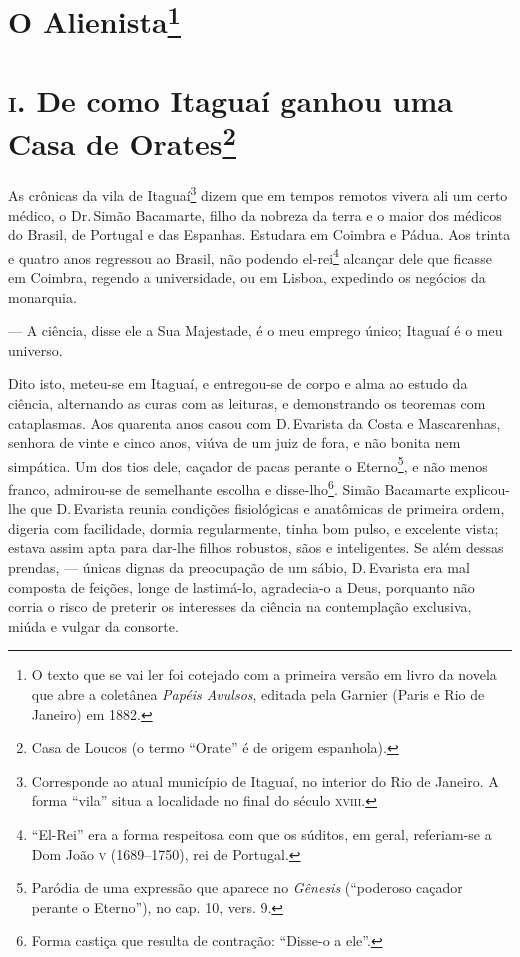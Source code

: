 \chapter{O Alienista\footnote[*]{O texto que se vai ler foi cotejado com a
  primeira versão em livro da novela que abre a coletânea \emph{Papéis
  Avulsos}, editada pela Garnier (Paris e Rio de Janeiro) em 1882.}}

\chapter{\textsc{i}. De como Itaguaí ganhou uma Casa de Orates\footnote{Casa de
  Loucos (o termo ``Orate'' é de origem espanhola).}}

As crônicas da vila de Itaguaí\footnote{Corresponde ao atual município
  de Itaguaí, no interior do Rio de Janeiro. A forma ``vila'' situa a
  localidade no final do século \textsc{xviii}.} dizem que em tempos remotos
vivera ali um certo médico, o Dr.\,Simão Bacamarte, filho da nobreza da
terra e o maior dos médicos do Brasil, de Portugal e das Espanhas.
Estudara em Coimbra e Pádua. Aos trinta e quatro anos regressou ao
Brasil, não podendo el-rei\footnote{``El-Rei'' era a forma respeitosa
  com que os súditos, em geral, referiam-se a Dom João \textsc{v} (1689--1750),
  rei de Portugal.} alcançar dele que ficasse em Coimbra, regendo a
universidade, ou em Lisboa, expedindo os negócios da monarquia.

--- A ciência, disse ele a Sua Majestade, é o meu emprego único; Itaguaí
é o meu universo.

Dito isto, meteu-se em Itaguaí, e entregou-se de corpo e alma ao estudo
da ciência, alternando as curas com as leituras, e demonstrando os
teoremas com cataplasmas. Aos quarenta anos casou com D.\,Evarista da
Costa e Mascarenhas, senhora de vinte e cinco anos, viúva de um juiz de
fora, e não bonita nem simpática. Um dos tios dele, caçador de pacas
perante o Eterno\footnote{Paródia de uma expressão que aparece no
  \emph{Gênesis} (``poderoso caçador perante o Eterno''), no cap. 10,
  vers. 9.}, e não menos franco, admirou-se de semelhante escolha e
disse-lho\footnote{Forma castiça que resulta de contração: ``Disse-o a
  ele''.}. Simão Bacamarte explicou-lhe que D.\,Evarista reunia condições
fisiológicas e anatômicas de primeira ordem, digeria com facilidade,
dormia regularmente, tinha bom pulso, e excelente vista; estava assim
apta para dar-lhe filhos robustos, sãos e inteligentes. Se além dessas
prendas, --- únicas dignas da preocupação de um sábio, D.\,Evarista era
mal composta de feições, longe de lastimá-lo, agradecia-o a Deus,
porquanto não corria o risco de preterir os interesses da ciência na
contemplação exclusiva, miúda e vulgar da consorte.

